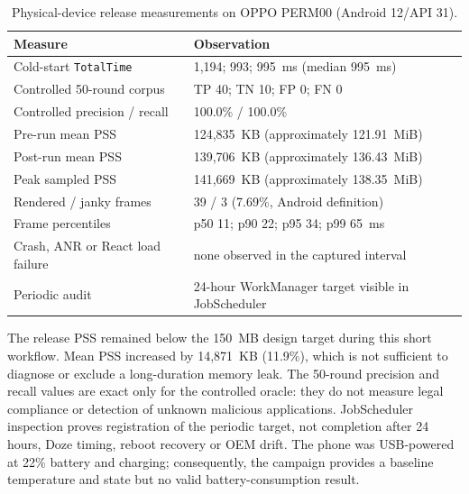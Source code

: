 \begin{table}[H]
\centering
\caption{Physical-device release measurements on OPPO PERM00 (Android 12/API 31).}
\label{tab:oppo-physical}
\begin{tabular}{@{}ll@{}}
\toprule
Measure & Observation \\
\midrule
Cold-start \texttt{TotalTime} & 1,194; 993; 995~ms (median 995~ms) \\
Controlled 50-round corpus & TP 40; TN 10; FP 0; FN 0 \\
Controlled precision / recall & 100.0\% / 100.0\% \\
Pre-run mean PSS & 124,835~KB (approximately 121.91~MiB) \\
Post-run mean PSS & 139,706~KB (approximately 136.43~MiB) \\
Peak sampled PSS & 141,669~KB (approximately 138.35~MiB) \\
Rendered / janky frames & 39 / 3 (7.69\%, Android definition) \\
Frame percentiles & p50 11; p90 22; p95 34; p99 65~ms \\
Crash, ANR or React load failure & none observed in the captured interval \\
Periodic audit & 24-hour WorkManager target visible in JobScheduler \\
\bottomrule
\end{tabular}
\end{table}

The release PSS remained below the 150~MB design target during this short workflow. Mean PSS increased by 14,871~KB (11.9\%), which is not sufficient to diagnose or exclude a long-duration memory leak. The 50-round precision and recall values are exact only for the controlled oracle: they do not measure legal compliance or detection of unknown malicious applications. JobScheduler inspection proves registration of the periodic target, not completion after 24 hours, Doze timing, reboot recovery or OEM drift. The phone was USB-powered at 22\% battery and charging; consequently, the campaign provides a baseline temperature and state but no valid battery-consumption result.

